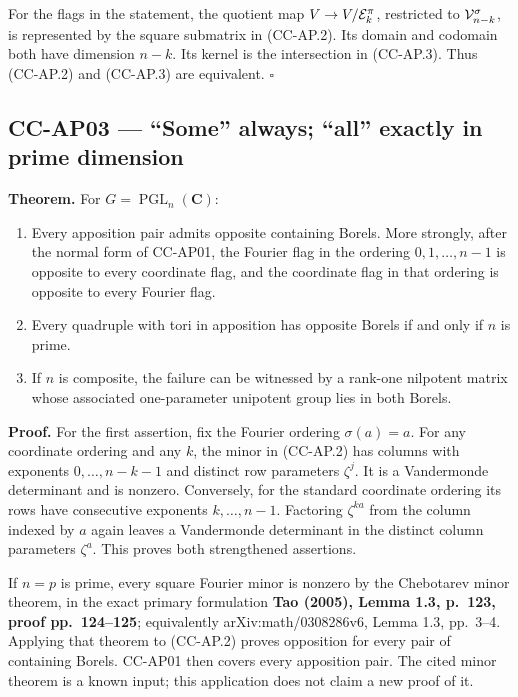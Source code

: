 For the flags in the statement, the quotient map
\(V\to V/{\cal E}^{\pi}_k\), restricted to \({\cal V}^{\sigma}_{n-k}\),
is represented by the square submatrix in (CC-AP.2). Its domain and
codomain both have dimension \(n-k\). Its kernel is the intersection in
(CC-AP.3). Thus (CC-AP.2) and (CC-AP.3) are equivalent. \(\square\)

\subsection{CC-AP03 --- ``Some'' always; ``all'' exactly in prime
dimension}\label{cc-ap03-some-always-all-exactly-in-prime-dimension}

\textbf{Theorem.} For \(G=\operatorname{PGL}_n(\mathbf C)\):

\begin{enumerate}
\def\labelenumi{\arabic{enumi}.}
\tightlist
\item
  Every apposition pair admits opposite containing Borels. More
  strongly, after the normal form of CC-AP01, the Fourier flag in the
  ordering \(0,1,\ldots,n-1\) is opposite to every coordinate flag, and
  the coordinate flag in that ordering is opposite to every Fourier
  flag.
\item
  Every quadruple with tori in apposition has opposite Borels if and
  only if \(n\) is prime.
\item
  If \(n\) is composite, the failure can be witnessed by a rank-one
  nilpotent matrix whose associated one-parameter unipotent group lies
  in both Borels.
\end{enumerate}

\textbf{Proof.} For the first assertion, fix the Fourier ordering
\(\sigma(a)=a\). For any coordinate ordering and any \(k\), the minor in
(CC-AP.2) has columns with exponents \(0,\ldots,n-k-1\) and distinct row
parameters \(\zeta^j\). It is a Vandermonde determinant and is nonzero.
Conversely, for the standard coordinate ordering its rows have
consecutive exponents \(k,\ldots,n-1\). Factoring \(\zeta^{ka}\) from
the column indexed by \(a\) again leaves a Vandermonde determinant in
the distinct column parameters \(\zeta^a\). This proves both
strengthened assertions.

If \(n=p\) is prime, every square Fourier minor is nonzero by the
Chebotarev minor theorem, in the exact primary formulation \textbf{Tao
(2005), Lemma 1.3, p.~123, proof pp.~124--125}; equivalently
arXiv:math/0308286v6, Lemma 1.3, pp.~3--4. Applying that theorem to
(CC-AP.2) proves opposition for every pair of containing Borels. CC-AP01
then covers every apposition pair. The cited minor theorem is a known
input; this application does not claim a new proof of it.

